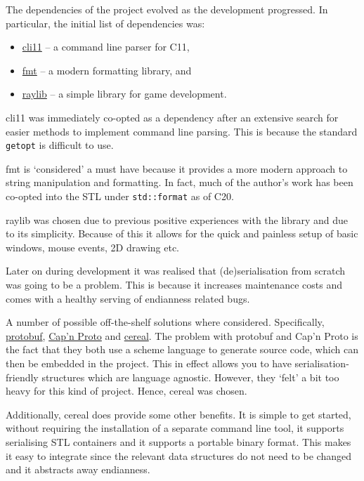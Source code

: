 \documentclass[article]{uom-coursework}
\def\CC{{C\nolinebreak\raisebox{.25ex}{\scriptsize\bfseries{++}}}}
\begin{document}
The dependencies of the project evolved as the
development progressed. In particular, the
initial list of dependencies was:

\begin{itemize}
    \item \href{https://github.com/CLIUtils/CLI11}{cli11} -- a command line parser for \CC{}11,
    \item \href{https://github.com/fmtlib/fmt}{fmt} -- a modern formatting library, and
    \item \href{https://github.com/raysan5/raylib}{raylib} -- a simple library for game development.
\end{itemize}

cli11 was immediately co-opted as a dependency after an
extensive search for easier methods to implement command line
parsing.  This is because the standard \texttt{getopt}
is difficult to use.

fmt is `considered' a must have because it provides a more
modern approach to string manipulation and formatting. In fact,
much of the author's work has been co-opted into the STL under
\texttt{std::format} as of \CC{}20.

raylib was chosen due to previous positive experiences with the
library and due to its simplicity. Because of this it allows for
the quick and painless setup of basic windows, mouse events, 2D
drawing etc.

Later on during development it was realised that
(de)serialisation from scratch was going to be a problem. This
is because it increases maintenance costs and comes with a
healthy serving of endianness related bugs.

A number of possible off-the-shelf solutions where considered.
Specifically, \href{https://protobuf.dev/}{protobuf},
\href{https://capnproto.org/}{Cap'n Proto} and
\href{https://uscilab.github.io/cereal/}{cereal}. The problem
with protobuf and Cap'n Proto is the fact that they both use a
scheme language to generate source code, which can then be
embedded in the project. This in effect allows
you to have serialisation-friendly structures which are language
agnostic. However, they `felt' a bit too heavy for this kind of
project. Hence, cereal was chosen.

Additionally, cereal does provide some other benefits. It is
simple to get started, without requiring the installation of a
separate command line tool, it supports serialising STL
containers and it supports a portable binary format. This makes
it easy to integrate since the relevant data structures do not
need to be changed and it abstracts away endianness.
\end{document}
